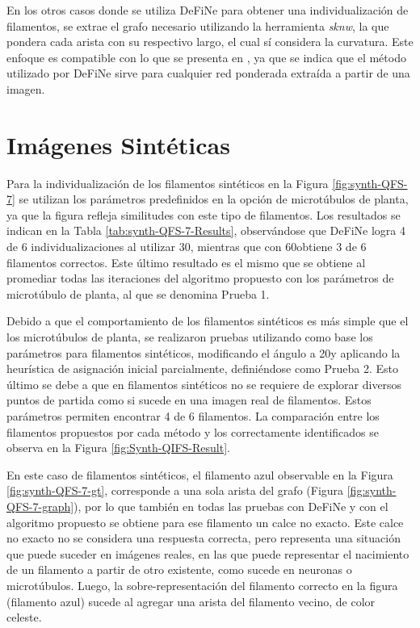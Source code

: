 En los otros casos donde se utiliza DeFiNe para obtener una individualizaci\'on de filamentos, se extrae el grafo necesario utilizando la herramienta {\it sknw}, la que pondera cada arista con su respectivo largo, el cual s\'i considera la curvatura. Este enfoque es compatible con lo que se presenta en \cite{breuer2015define}, ya que se indica que el m\'etodo utilizado por DeFiNe sirve para cualquier red ponderada extra\'ida a partir de una imagen.


\section{Im\'agenes Sint\'eticas}

Para la individualizaci\'on de los filamentos sint\'eticos en la Figura \ref{fig:synth-QFS-7} se utilizan los par\'ametros predefinidos en la opci\'on de microt\'ubulos de planta, ya que la figura refleja similitudes con este tipo de filamentos.
Los resultados se indican en la Tabla \ref{tab:synth-QFS-7-Results}, observ\'andose que DeFiNe logra 4 de 6 individualizaciones al utilizar 30\textdegree, mientras que con 60\textdegree obtiene 3 de 6 filamentos correctos. Este \'ultimo resultado es el mismo que se obtiene al promediar todas las iteraciones del algoritmo propuesto con los par\'ametros de microt\'ubulo de planta, al que se denomina Prueba 1.

Debido a que el comportamiento de los filamentos sint\'eticos es m\'as simple que el los microt\'ubulos de planta, se realizaron pruebas utilizando como base los par\'ametros para filamentos sint\'eticos, modificando el \'angulo a 20\textdegree y aplicando la heur\'istica de asignaci\'on inicial parcialmente, defini\'endose como Prueba 2. Esto \'ultimo se debe a que en filamentos sint\'eticos no se requiere de explorar diversos puntos de partida como si sucede en una imagen real de filamentos. Estos par\'ametros permiten encontrar 4 de 6 filamentos. La comparaci\'on entre los filamentos propuestos por cada m\'etodo y los correctamente identificados se observa en la Figura \ref{fig:Synth-QIFS-Result}.


En este caso de filamentos sint\'eticos, el filamento azul observable en la Figura \ref{fig:synth-QFS-7-gt}, corresponde a una sola arista del grafo (Figura \ref{fig:synth-QFS-7-graph}), por lo que tambi\'en en todas las pruebas con DeFiNe y con el algoritmo propuesto se obtiene para ese filamento un calce no exacto. Este calce no exacto no se considera una respuesta correcta, pero representa una situaci\'on que puede suceder en im\'agenes reales, en las que puede representar el nacimiento de un filamento a partir de otro existente, como sucede en neuronas o microt\'ubulos. 
Luego, la sobre-representaci\'on del filamento correcto en la figura (filamento azul) sucede al agregar una arista del filamento vecino, de color celeste.


